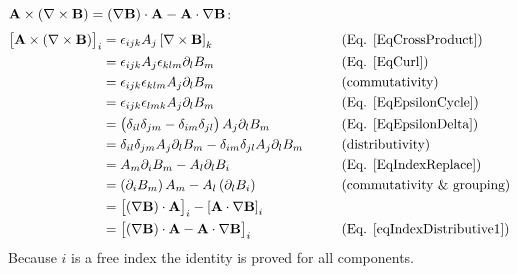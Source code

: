  
$\mathbf{ A}\times\left(\nabla\times\mathbf{ B}\right)=\left(\nabla\mathbf{ B}
\right)\cdot\mathbf{ A}-\mathbf{ A}\cdot\nabla\mathbf{ B}$:
\begin{equation}
\begin{aligned}\left[\mathbf{ A}\times\left(\nabla\times\mathbf{ B}\right)\right]_
{i} & =\epsilon_{ijk}A_{j}\left[\nabla\times\mathbf{ B}\right]_{k} & 
\,\,\,\,\,\,\,\,\,\,\, & \text{(Eq. \ref{EqCrossProduct})}\\
 & =\epsilon_{ijk}A_{j}\epsilon_{klm}\partial_{l}B_{m} &  & \text{(Eq. 
\ref{EqCurl})}\\
 & =\epsilon_{ijk}\epsilon_{klm}A_{j}\partial_{l}B_{m} &  & 
\text{(commutativity)}\\
 & =\epsilon_{ijk}\epsilon_{lmk}A_{j}\partial_{l}B_{m} &  & \text{(Eq. 
\ref{EqEpsilonCycle})}\\
 & 
=\left(\delta_{il}\delta_{jm}-\delta_{im}\delta_{jl}\right)A_{j}\partial_{l}B_{m
} &  & \text{(Eq. \ref{EqEpsilonDelta})}\\
 & 
=\delta_{il}\delta_{jm}A_{j}\partial_{l}B_{m}-\delta_{im}\delta_{jl}A_{j}
\partial_{l}B_{m} &  & \text{(distributivity)}\\
 & =A_{m}\partial_{i}B_{m}-A_{l}\partial_{l}B_{i} &  & \text{(Eq. 
\ref{EqIndexReplace})}\\
 & =\left(\partial_{i}B_{m}\right)A_{m}-A_{l}\left(\partial_{l}B_{i}\right) &  & 
\text{(commutativity \& grouping)}\\
 & 
=\left[\left(\nabla\mathbf{ B}\right)\cdot\mathbf{ A}\right]_{i}-\left[\mathbf{ A}
\cdot\nabla\mathbf{ B}\right]_{i} &  & \\
 & 
=\left[\left(\nabla\mathbf{ B}\right)\cdot\mathbf{ A}-\mathbf{ A}\cdot\nabla\mathbf
{B}\right]_{i} &  & \text{(Eq. \ref{eqIndexDistributive1})}
\end{aligned}
\end{equation}
Because $i$ is a free index the identity is proved for all components.

